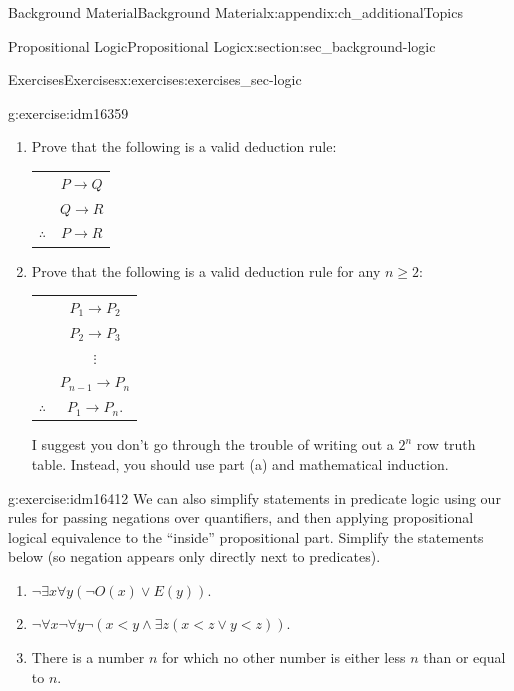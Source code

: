 \documentclass[oneside,10pt,]{book}
\numberwithin{equation}{chapter}
\newcommand{\hrulethin}  {\noalign{\hrule height 0.04em}}
\def\imp{\rightarrow}
\newcommand{\lt}{<}
\begin{document}
\begin{appendixptx}{Background Material}{}{Background Material}{}{}{x:appendix:ch_additionalTopics}
\begin{sectionptx}{Propositional Logic}{}{Propositional Logic}{}{}{x:section:sec_background-logic}
\begin{exercises-subsection}{Exercises}{}{Exercises}{}{}{x:exercises:exercises_sec-logic}
\begin{divisionexercise}{13}{}{}{g:exercise:idm16359}
\par
%
\begin{enumerate}[label=(\alph*)]
\item{}Prove that the following is a valid deduction rule:%
\begin{sidebyside}{1}{0}{0}{0}%
\begin{sbspanel}{1}%
{\centering%
\begin{tabular}{cc}
&\(P \imp Q\)\tabularnewline[0pt]
&\(Q \imp R\)\tabularnewline\hrulethin
\(\therefore\)&\(P \imp R\)
\end{tabular}
\par}
\end{sbspanel}%
\end{sidebyside}%
\item{}Prove that the following is a valid deduction rule for any \(n \ge 2\):%
\begin{sidebyside}{1}{0}{0}{0}%
\begin{sbspanel}{1}%
{\centering%
\begin{tabular}{cc}
&\(P_1 \imp P_2\)\tabularnewline[0pt]
&\(P_2 \imp P_3\)\tabularnewline[0pt]
&\(\vdots\)\tabularnewline[0pt]
&\(P_{n-1} \imp P_n\)\tabularnewline\hrulethin
\(\therefore\)&\(P_1 \imp P_n\).
\end{tabular}
\par}
\end{sbspanel}%
\end{sidebyside}%
\par
I suggest you don't go through the trouble of writing out a \(2^n\) row truth table. Instead, you should use part (a) and mathematical induction. %
\end{enumerate}
%
\end{divisionexercise}%
\begin{divisionexercise}{14}{}{}{g:exercise:idm16412}%
We can also simplify statements in predicate logic using our rules for passing negations over quantifiers, and then applying propositional logical equivalence to the ``inside'' propositional part.  Simplify the statements below (so negation appears only directly next to predicates).%
\par
%
\begin{enumerate}[label=(\alph*)]
\item{}\(\neg \exists x \forall y (\neg O(x) \vee E(y))\).%
\item{}\(\neg \forall x \neg \forall y \neg(x \lt  y \wedge \exists z (x \lt  z \vee y \lt  z))\).%
\item{}There is a number \(n\) for which no other number is either less \(n\) than or equal to \(n\).%

\end{enumerate}
\end{divisionexercise}
\end{exercises-subsection}
\end{sectionptx}
\end{appendixptx}
\end{document}
